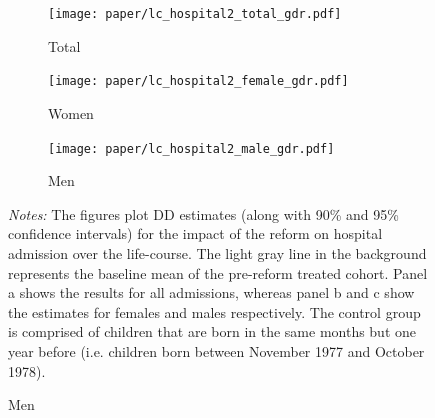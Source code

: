 \documentclass[11pt, a4paper]{article} %
\begin{document}
\newpage
\begin{landscape}
	\vspace*{\fill}
	\begin{figure}[H]\centering
		\caption{Life-course approach for hospital admission}\label{fig: lc_hospital2_gdr_DD}
		\begin{subfigure}[h]{0.31\linewidth}\centering\caption{Total}
			\texttt{[image: paper/lc\_hospital2\_total\_gdr.pdf]}
		\end{subfigure}
		\begin{subfigure}[h]{0.31\linewidth}\centering\caption{Women}
			\texttt{[image: paper/lc\_hospital2\_female\_gdr.pdf]}
		\end{subfigure}
		\begin{subfigure}[h]{0.31\linewidth}\centering\caption{Men}
			\texttt{[image: paper/lc\_hospital2\_male\_gdr.pdf]}
		\end{subfigure}
		\scriptsize
		\begin{minipage}{\linewidth}
			\emph{Notes:} The figures plot DD estimates (along with 90\% and 95\% confidence intervals) for the impact of the reform on hospital admission over the life-course. The light gray line in the background represents the baseline mean of the pre-reform treated cohort. Panel a shows the results for all admissions, whereas panel b and c show the estimates for females and males respectively. The control group is comprised of children	that are born in the same months but one year before (i.e. children born between November 1977 and October 1978).
		\end{minipage}
	\end{figure}
	\vspace*{\fill}\clearpage
\end{landscape}
\end{document}
